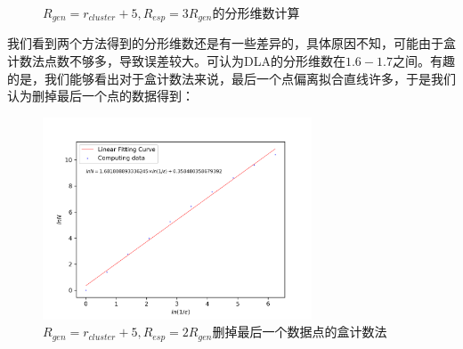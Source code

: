 \documentclass[a4paper,11pt]{article}
\begin{document}
\begin{figure}[!htbp]   
\centering     
{}
\caption{$R_{gen} = r_{cluster} + 5, R_{esp} = 3R_{gen}$的分形维数计算}      
\end{figure}


我们看到两个方法得到的分形维数还是有一些差异的，具体原因不知，可能由于盒计数法点数不够多，导致误差较大。可认为DLA的分形维数在$1.6-1.7$之间。有趣的是，我们能够看出对于盒计数法来说，最后一个点偏离拟合直线许多，于是我们认为删掉最后一个点的数据得到：

\begin{figure}[!htbp]        
\centering
\includegraphics[bb= 0 0 460.8 345.6, width = 8cm]{分形维数/box-5-2*min-2.png}      
\caption{$R_{gen} = r_{cluster} + 5, R_{esp} = 2R_{gen}$删掉最后一个数据点的盒计数法}      
\end{figure}
\end{document}
